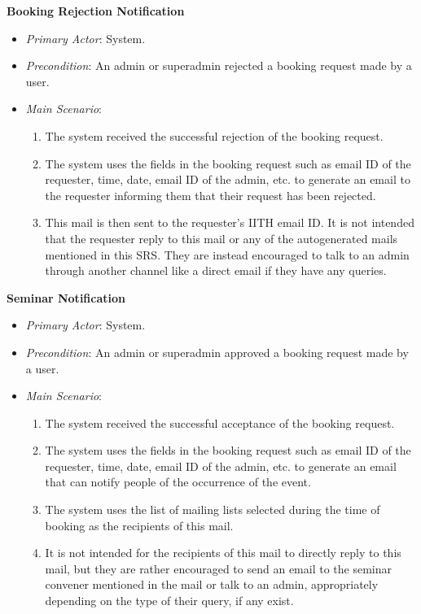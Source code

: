 \documentclass{article}
\begin{document}
\textbf{Booking Rejection Notification}
\label{ucbookingrejectionnotification}
\begin{itemize}
    \item \textit{Primary Actor}: System.
    \item \textit{Precondition}: An admin or superadmin rejected a booking request made by a user. 
    \item \textit{Main Scenario}:
    \begin{enumerate}
        \item The system received the successful rejection of the booking request. 
        \item The system uses the fields in the booking request such as email ID of the requester, time, date, email ID of the admin, etc. to generate an email to the requester informing them that their request has been rejected.  
        \item This mail is then sent to the requester's IITH email ID. It is not intended that the requester reply to this mail or any of the autogenerated mails mentioned in this SRS. They are instead encouraged to talk to an admin through another channel like a direct email if they have any queries. 
    \end{enumerate} 
\end{itemize}

\textbf{Seminar Notification}
\label{ucseminarnotification}
\begin{itemize}
    \item \textit{Primary Actor}: System.
    \item \textit{Precondition}: An admin or superadmin approved a booking request made by a user.
    \item \textit{Main Scenario}:
    \begin{enumerate}
        \item The system received the successful acceptance of the booking request. 
         \item The system uses the fields in the booking request such as email ID of the requester, time, date, email ID of the admin, etc. to generate an email that can notify people of the occurrence of the event.
         \item The system uses the list of mailing lists selected during the time of booking as the recipients of this mail.
         \item It is not intended for the recipients of this mail to directly reply to this mail, but they are rather encouraged to send an email to the seminar convener mentioned in the mail or talk to an admin, appropriately depending on the type of their query, if any exist.
    \end{enumerate} 
\end{itemize}
\end{document}

